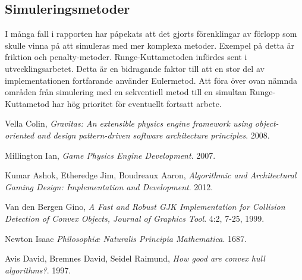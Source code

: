 \documentclass[a4paper,12pt,twopage,swedish]{article}
\begin{document}
\subsection{Simuleringsmetoder}
I många fall i rapporten har påpekats att det gjorts förenklingar av förlopp som skulle vinna på att simuleras med mer komplexa metoder. Exempel på detta är friktion och penalty-metoder.  Runge-Kuttametoden infördes sent i utvecklingsarbetet. Detta är en bidragande faktor till att en stor del av implementationen fortfarande använder Eulermetod. Att föra över ovan nämnda områden från simulering med en sekventiell metod till en simultan Runge-Kuttametod har hög prioritet för eventuellt fortsatt arbete.


\clearpage
\begin{thebibliography}{9}

  Vella Colin,
  \emph{Gravitas: An extensible physics engine framework using object-oriented and design pattern-driven software architecture principles}.
  2008.

  Millington Ian,
  \emph{Game Physics Engine Development}.
  2007.

  Kumar Ashok, Etheredge Jim, Boudreaux Aaron,
  \emph{Algorithmic and Architectural Gaming Design: Implementation and Development}.
  2012.

  Van den Bergen Gino,
  \emph{A Fast and Robust GJK Implementation for Collision Detection of Convex Objects, Journal of Graphics Tool}.
  4:2, 7-25,
  1999.

  Newton Isaac
  \emph{Philosophiæ Naturalis Principia Mathematica}.
  1687.

  Avis David, Bremnes David, Seidel Raimund,
  \emph{How good are convex hull algorithms?}.
  1997.

\end{thebibliography}
\end{document}
